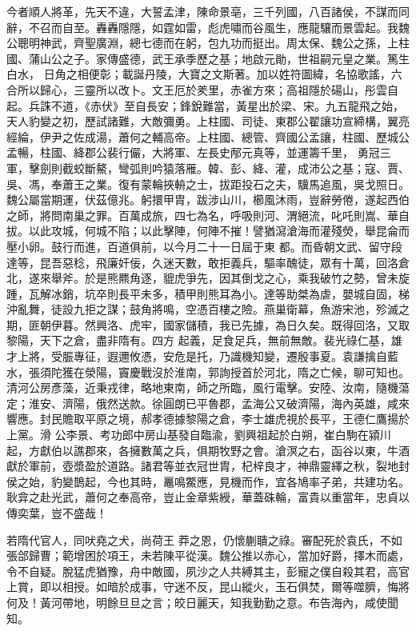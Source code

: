 \begin{pinyinscope}
 今者順人將革，先天不違，大誓孟津，陳命景亳，三千列國，八百諸侯，不謀而同辭，不召而自至。轟轟隱隱，如霆如雷，彪虎嘯而谷風生，應龍驤而景雲起。我魏公聰明神武，齊聖廣淵，總七德而在躬，包九功而挺出。周太保、魏公之孫，上柱國、蒲山公之子。家傳盛德，武王承季歷之基；地啟元勛，世祖嗣元皇之業。篤生白水，
 日角之相便彰；載誕丹陵，大寶之文斯著。加以姓符圖緯，名協歌謠，六合所以歸心，三靈所以改卜。文王厄於羑里，赤雀方來；高祖隱於碭山，彤雲自起。兵誅不道，《赤伏》至自長安；鋒銳難當，黃星出於梁、宋。九五龍飛之始，天人豹變之初，歷試諸難，大敵彌勇。上柱國、司徒、東郡公翟讓功宣締構，翼亮經綸，伊尹之佐成湯，蕭何之輔高帝。上柱國、總管、齊國公孟讓，柱國、歷城公孟暢，柱國、絳郡公裴行儼，大將軍、左長史邴元真等，並運籌千里，
 勇冠三軍，擊劍則截蛟斷鰲，彎弧則吟猿落雁。韓、彭、絳、灌，成沛公之基；寇、賈、吳、馮，奉蕭王之業。復有蒙輪挾輈之士，拔距投石之夫，驥馬追風，吳戈照日。魏公屬當期運，伏茲億兆。躬擐甲胄，跋涉山川，櫛風沐雨，豈辭勞倦，遂起西伯之師，將問南巢之罪。百萬成旅，四七為名，呼吸則河、渭絕流，叱吒則嵩、華自拔。以此攻城，何城不陷；以此擊陣，何陣不摧！譬猶瀉滄海而灌殘熒，舉昆侖而壓小卵。鼓行而進，百道俱前，以今月二十一日屆于東
 都。而昏朝文武、留守段達等，昆吾惡稔，飛廉奸佞，久迷天數，敢拒義兵，驅率醜徒，眾有十萬，回洛倉北，遂來舉斧。於是熊羆角逐，貔虎爭先，因其倒戈之心，乘我破竹之勢，曾未旋踵，瓦解冰銷，坑卒則長平未多，積甲則熊耳為小。達等助桀為虐，嬰城自固，梯沖亂舞，徒設九拒之謀；鼓角將鳴，空憑百樓之險。燕巢衛幕，魚游宋池，殄滅之期，匪朝伊暮。然興洛、虎牢，國家儲積，我已先據，為日久矣。既得回洛，又取黎陽，天下之倉，盡非隋有。四方
 起義，足食足兵，無前無敵。裴光祿仁基，雄才上將，受脤專征，遐邇攸憑，安危是托，乃識機知變，遷殷事夏。袁謙擒自藍水，張須陀獲在滎陽，竇慶戰沒於淮南，郭詢授首於河北，隋之亡候，聊可知也。清河公房彥藻，近秉戎律，略地東南，師之所臨，風行電擊。安陸、汝南，隨機蕩定；淮安、濟陽，俄然送款。徐圓朗已平魯郡，孟海公又破濟陽，海內英雄，咸來響應。封民贍取平原之境，郝孝德據黎陽之倉，李士雄虎視於長平，王德仁鷹揚於上黨。滑
 公李景、考功郎中房山基發自臨渝，劉興祖起於白朔，崔白駒在潁川起，方獻伯以譙郡來，各擁數萬之兵，俱期牧野之會。滄溟之右，函谷以東，牛酒獻於軍前，壺漿盈於道路。諸君等並衣冠世胄，杞梓良才，神鼎靈繹之秋，裂地封侯之始，豹變鵲起，今也其時，鼉鳴鱉應，見機而作，宜各鳩率子弟，共建功名。耿弇之赴光武，蕭何之奉高帝，豈止金章紫綬，華蓋硃輪，富貴以重當年，忠貞以傳奕葉，豈不盛哉！



 若隋代官人，同吠堯之犬，尚荷王
 莽之恩，仍懷蒯聵之祿。審配死於袁氏，不如張郃歸曹；範增困於項王，未若陳平從漢。魏公推以赤心，當加好爵，擇木而處，令不自疑。脫猛虎猶豫，舟中敵國，夙沙之人共縛其主，彭寵之僕自殺其君，高官上賞，即以相授。如暗於成事，守迷不反，昆山縱火，玉石俱焚，爾等噬臍，悔將何及！黃河帶地，明餘旦旦之言；皎日麗天，知我勤勤之意。布告海內，咸使聞知。




\end{pinyinscope}
